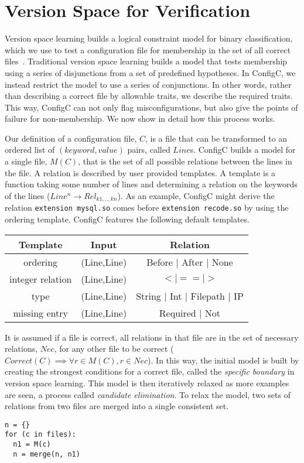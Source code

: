 \section{Version Space for Verification}

Version space learning builds a logical constraint model for binary classification, which we use to test a configuration file for membership in the set of all correct files~\cite{mitchell82}.
Traditional version space learning builds a model that tests membership using a series of disjunctions from a set of predefined hypotheses.
In ConfigC, we instead restrict the model to use a series of conjunctions.
In other words, rather than describing a correct file by allowable traits, we describe the required traits. 
This way, ConfigC can not only flag misconfigurations, but also give the points of failure for non-membership.
We now show in detail how this process works.

Our definition of a configuration file, $C$, is a file that can be transformed to an ordered list of $(keyword, value)$ pairs, called $Line$s.
ConfigC builds a model for a single file, $M(C)$, that is the set of all possible relations between the lines in the file.
A relation is described by user provided templates.
A template is a function taking some number of lines and determining a relation on the keywords of the lines ($Line^{n} \rightarrow Rel_{k1,..,kn}$).
As an example, ConfigC might derive the relation \texttt{extension mysql.so} comes before \texttt{extension recode.so} by using the ordering template.
ConfigC features the following default templates.

\begin{center}
\begin{tabular} {|c |c |c |}
 \hline
 Template & Input  & Relation \\
\hline
 ordering & (Line,Line) & Before $\vert$ After $\vert$ None \\
 \hline
 integer relation & (Line,Line)  & $< | == | >$  \\
\hline
 type & (Line,Line)  & String $\vert$ Int $\vert$ Filepath $\vert$ IP  \\
\hline
 missing entry & (Line,Line) & Required $\vert$ Not \\
\hline
\end{tabular}
\end{center}

It is assumed if a file is correct, all relations in that file are in the set of necessary relations, $Nec$, for any other file to be correct ($Correct(C) \implies \forall r \in M(C), r \in Nec$).
In this way, the initial model is built by creating the strongest conditions for a correct file, called the \textit{specific boundary} in version space learning.
This model is then iteratively relaxed as more examples are seen, a process called \textit{candidate elimination}.
To relax the model, two sets of relations from two files are merged into a single consistent set.
\begin{lstlisting}
n = {}
for (c in files):
  n1 = M(c)
  n = merge(n, n1)
\end{lstlisting}

